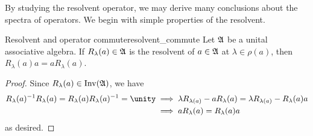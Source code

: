 By studying the resolvent operator, we may derive many conclusions about the spectra of operators. We begin with simple properties of the resolvent.
\begin{proposition}{Resolvent and operator commute}{resolvent_commute}
    Let \(\mathfrak{A}\) be a unital associative algebra. If \(R_{\lambda}(a) \in \mathfrak{A}\) is the resolvent of \(a \in \mathfrak{A}\) at \(\lambda \in \rho(a)\), then \(R_{\lambda}(a)a = aR_{\lambda}(a)\).
\end{proposition}
\begin{proof}
    Since \(R_{\lambda}(a) \in \operatorname{Inv}(\mathfrak{A})\), we have
    \begin{align*}
        R_{\lambda}(a)^{-1} R_{\lambda}(a) = R_{\lambda}(a) R_{\lambda}(a)^{-1} = \unity
        &\implies  \lambda R_{\lambda(a)} - aR_{\lambda}(a) = \lambda R_{\lambda(a)} - R_{\lambda}(a) a\\
        &\implies a R_{\lambda}(a) = R_{\lambda}(a)a
    \end{align*}
    as desired.
\end{proof}


